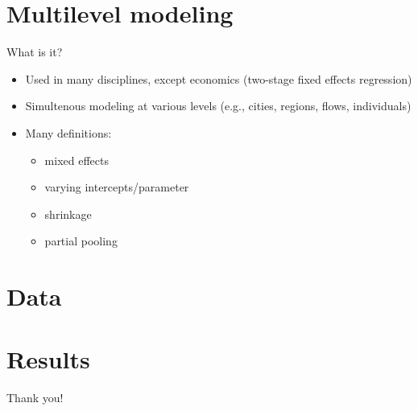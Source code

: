 \documentclass{beamer}
\begin{document}
  \section{Multilevel modeling}

  \begin{frame}{What is it?}
\begin{itemize}
\item Used in many disciplines, except economics (two-stage fixed effects regression)

    \item Simultenous modeling at various levels (e.g., cities, regions, flows, individuals)

    \item Many definitions:
    \begin{itemize}
    \item mixed effects 
    \item varying intercepts/parameter 
    \item shrinkage 
      \item partial pooling
          \end{itemize}
\end{itemize}

    
  \end{frame}

  \section{Data}


  \section{Results}

\begin{frame}[standout]
Thank you!
\end{frame}
\end{document}
